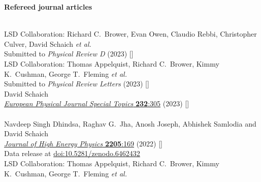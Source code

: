\begin{spacelist}
  \item {\large \bfseries Refereed journal articles}
  \begin{revnumerate}
    \setlength{\topsep}{-8 pt}
    \setlength{\itemsep}{10 pt}
    \setlength{\leftmargin}{0 mm}
    \pagebreakitem
       \\
      LSD Collaboration: Richard C.~Brower, Evan Owen, Claudio Rebbi, Christopher Culver, David Schaich \textit{et al.} \\ %
      Submitted to \textit{Physical Review D} (2023) []
    \pagebreakitem
       \\
      LSD Collaboration: Thomas Appelquist, Richard C.~Brower, Kimmy K.~Cushman, George T.~Fleming \textit{et al.} \\ %
      Submitted to \textit{Physical Review Letters} (2023) []
    \pagebreakitem
       \\
      David Schaich \\
      \href{https://doi.org/10.1140/epjs/s11734-022-00708-1}{\textit{European Physical Journal Special Topics} \textbf{232}:305} (2023) [] \\
    \pagebreakitem
       \\
      Navdeep Singh Dhindsa, Raghav G.~Jha, Anosh Joseph, Abhishek Samlodia and David Schaich \\
      \href{https://doi.org/10.1007/JHEP05(2022)169}{\textit{Journal of High Energy Physics} \textbf{2205}:169} (2022) [] \\
      Data release at \href{https://doi.org/10.5281/zenodo.6462432}{doi:10.5281/zenodo.6462432}
    \pagebreakitem
       \\
      LSD Collaboration: Thomas Appelquist, Richard C.~Brower, Kimmy K.~Cushman, George T.~Fleming \textit{et al.} \\ %

\end{revnumerate}
\end{spacelist}
